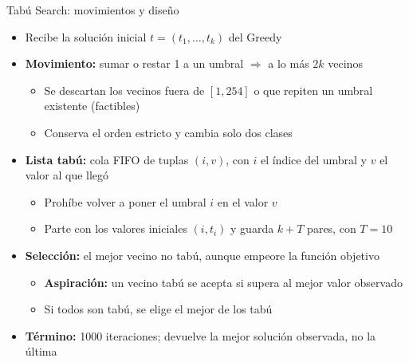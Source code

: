 \documentclass[aspectratio=169, 10pt]{beamer}
\begin{document}
\begin{frame}{Tabú Search: movimientos y diseño}
  \begin{itemize}
    \item Recibe la solución inicial $t = (t_1, \ldots, t_k)$ del Greedy
    \item \textbf{Movimiento:} sumar o restar 1 a un umbral $\Rightarrow$ a lo más $2k$ vecinos
    \begin{itemize}
      \item Se descartan los vecinos fuera de $[1, 254]$ o que repiten un umbral existente (factibles)
      \item Conserva el orden estricto y cambia solo dos clases
    \end{itemize}
    \item \textbf{Lista tabú:} cola FIFO de tuplas $(i, v)$, con $i$ el índice del umbral y $v$ el valor al que llegó
    \begin{itemize}
      \item Prohíbe volver a poner el umbral $i$ en el valor $v$
      \item Parte con los valores iniciales $(i, t_i)$ y guarda $k + T$ pares, con $T = 10$
    \end{itemize}
    \item \textbf{Selección:} el mejor vecino no tabú, aunque empeore la función objetivo
    \begin{itemize}
      \item \textbf{Aspiración:} un vecino tabú se acepta si supera al mejor valor observado
      \item Si todos son tabú, se elige el mejor de los tabú
    \end{itemize}
    \item \textbf{Término:} 1000 iteraciones; devuelve la mejor solución observada, no la última
  \end{itemize}
\end{frame}
\end{document}
